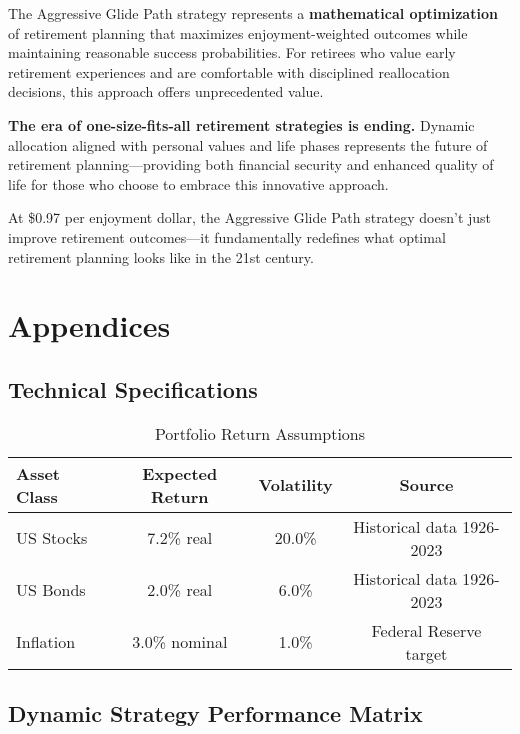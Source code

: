 \documentclass[11pt,letterpaper]{article}
\begin{document}
The Aggressive Glide Path strategy represents a \textbf{mathematical optimization} of retirement planning that maximizes enjoyment-weighted outcomes while maintaining reasonable success probabilities. For retirees who value early retirement experiences and are comfortable with disciplined reallocation decisions, this approach offers unprecedented value.

\textbf{The era of one-size-fits-all retirement strategies is ending.} Dynamic allocation aligned with personal values and life phases represents the future of retirement planning—providing both financial security and enhanced quality of life for those who choose to embrace this innovative approach.

At \$0.97 per enjoyment dollar, the Aggressive Glide Path strategy doesn't just improve retirement outcomes—it fundamentally redefines what optimal retirement planning looks like in the 21st century.

\section{Appendices}

\subsection{Technical Specifications}

\begin{table}[H]
\centering
\begin{tabular}{@{}lccc@{}}
\toprule
\textbf{Asset Class} & \textbf{Expected Return} & \textbf{Volatility} & \textbf{Source} \\
\midrule
US Stocks & 7.2\% real & 20.0\% & Historical data 1926-2023 \\
US Bonds & 2.0\% real & 6.0\% & Historical data 1926-2023 \\
Inflation & 3.0\% nominal & 1.0\% & Federal Reserve target \\
\bottomrule
\end{tabular}
\caption{Portfolio Return Assumptions}
\label{tab:returns}
\end{table}

\subsection{Dynamic Strategy Performance Matrix}
\end{document}
